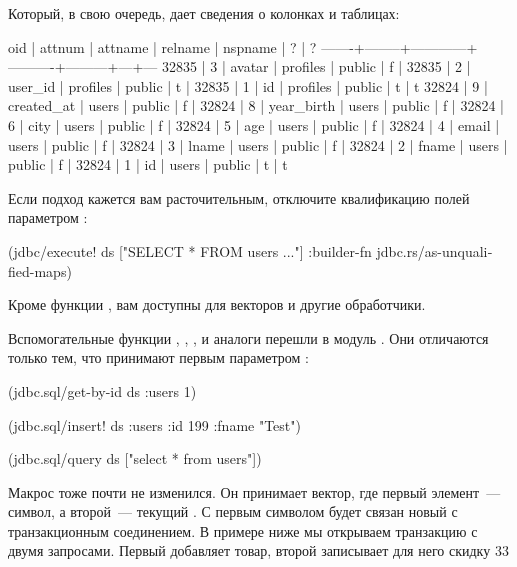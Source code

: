Который, в свою очередь, дает сведения о колонках и таблицах:

\begin{english}
  \begin{text}
  oid  | attnum |  attname   | relname  | nspname | ? | ?
-------+--------+------------+----------+---------+---+---
 32835 |      3 | avatar     | profiles | public  | f |
 32835 |      2 | user_id    | profiles | public  | t |
 32835 |      1 | id         | profiles | public  | t | t
 32824 |      9 | created_at | users    | public  | f |
 32824 |      8 | year_birth | users    | public  | f |
 32824 |      6 | city       | users    | public  | f |
 32824 |      5 | age        | users    | public  | f |
 32824 |      4 | email      | users    | public  | f |
 32824 |      3 | lname      | users    | public  | f |
 32824 |      2 | fname      | users    | public  | f |
 32824 |      1 | id         | users    | public  | t | t
  \end{text}
\end{english}

Если подход кажется вам расточительным, отключите квалификацию полей параметром :

\begin{english}
  \begin{clojure}
(jdbc/execute!
 ds
 ["SELECT * FROM users ..."]
 {:builder-fn jdbc.rs/as-unqualified-maps})
  \end{clojure}
\end{english}

Кроме функции , вам доступны  для векторов и другие обработчики.

Вспомогательные функции , , ,  и аналоги перешли в модуль . Они отличаются только тем, что принимают первым параметром :

\begin{english}
  \begin{clojure}
(jdbc.sql/get-by-id ds :users 1)

(jdbc.sql/insert! ds :users {:id 199 :fname "Test"})

(jdbc.sql/query ds ["select * from users"])
  \end{clojure}
\end{english}

Макрос  тоже почти не изменился. Он принимает вектор, где первый элемент~--- символ, а второй~--- текущий . С первым символом будет связан новый  с транзакционным соединением. В примере ниже мы открываем транзакцию с двумя запросами. Первый добавляет товар, второй записывает для него скидку 33%

